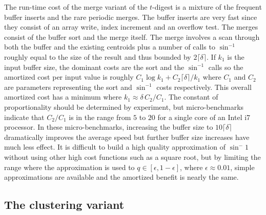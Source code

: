 \documentclass[11pt]{amsart}
\begin{document}
The run-time cost of the merge variant of the $t$-digest is a mixture of the frequent buffer inserts  and the rare periodic merges. The buffer inserts are very fast since they consist of an array write, index increment and an overflow test. The merges consist of the buffer sort and the merge itself. The merge involves a scan through both the buffer and the existing centroids plus a number of calls to $\sin^{-1}$ roughly equal to the size of the result and thus bounded by $2 \lceil \delta \rceil$. If $k_1$ is the input buffer size, the dominant costs are the sort and the $\sin^{-1}$ calls so the amortized cost per input value is roughly $C_1 \log k_1 + C_2 \lceil \delta \rceil / k_1$ where $C_1$ and $C_2$ are parameters representing the sort and $\sin^{-1}$ costs respectively. This overall amortized cost has a minimum where $k_1 \approx \delta\, C_2  / C_1$. The constant of proportionality should be determined by experiment, but micro-benchmarks indicate that $C_2 / C_1$ is in the range from $5$ to $20$ for a single core of an Intel i7 processor. In these micro-benchmarks, increasing the buffer size to $10 \lceil \delta \rceil$ dramatically improves the average speed but further buffer size increases have much less effect. It is difficult to build a high quality approximation of $\sin^-1$ without using other high cost functions such as a square root, but by limiting the range where the approximation is used to $q \in [\epsilon, 1-\epsilon]$, where $\epsilon \approx 0.01$, simple approximations are available and the amortized benefit is nearly the same.

\subsection{The clustering variant}

\end{document}
